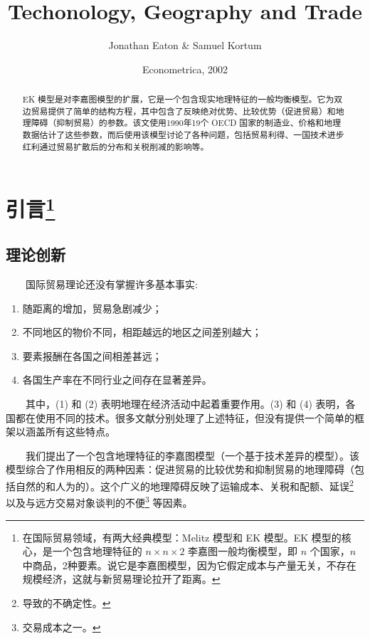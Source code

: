 \documentclass[]{article}
\title{Techonology, Geography and Trade}
\author{Jonathan Eaton \& Samuel Kortum}
\date{Econometrica, 2002}
\providecommand{\tightlist}{%
  \setlength{\itemsep}{0pt}\setlength{\parskip}{0pt}}
\let\rmarkdownfootnote\footnote%
\def\footnote{\protect\rmarkdownfootnote}
\begin{document}
\maketitle
\begin{abstract}
EK 模型是对李嘉图模型的扩展，它是一个包含现实地理特征的一般均衡模型。它为双边贸易提供了简单的结构方程，其中包含了反映绝对优势、比较优势（促进贸易）和地理障碍（抑制贸易）的参数。该文使用1990年19个 OECD 国家的制造业、价格和地理数据估计了这些参数，而后使用该模型讨论了各种问题，包括贸易利得、一国技术进步红利通过贸易扩散后的分布和关税削减的影响等。
\end{abstract}

{
\setcounter{tocdepth}{3}
\tableofcontents
}
\hypertarget{section}{%
\section[引言]{\texorpdfstring{引言\footnote{在国际贸易领域，有两大经典模型：Melitz 模型和 EK 模型。EK 模型的核心，是一个包含地理特征的 \(n \times n \times 2\) 李嘉图一般均衡模型，即 \(n\) 个国家，\(n\) 中商品，2种要素。说它是李嘉图模型，因为它假定成本与产量无关，不存在规模经济，这就与新贸易理论拉开了距离。}}{引言}}\label{section}}

\hypertarget{section-1}{%
\subsection{理论创新}\label{section-1}}

　　国际贸易理论还没有掌握许多基本事实:

\begin{enumerate}
\def\labelenumi{(\arabic{enumi})}
\tightlist
\item
  随距离的增加，贸易急剧减少；\\
\item
  不同地区的物价不同，相距越远的地区之间差别越大；\\
\item
  要素报酬在各国之间相差甚远；\\
\item
  各国生产率在不同行业之间存在显著差异。
\end{enumerate}

　　其中，(1) 和 (2) 表明地理在经济活动中起着重要作用。(3) 和 (4) 表明，各国都在使用不同的技术。很多文献分别处理了上述特征，但没有提供一个简单的框架以涵盖所有这些特点。

　　我们提出了一个包含地理特征的李嘉图模型（一个基于技术差异的模型）。该模型综合了作用相反的两种因素：促进贸易的比较优势和抑制贸易的地理障碍（包括自然的和人为的）。这个广义的地理障碍反映了运输成本、关税和配额、延误\footnote{导致的不确定性。} 以及与远方交易对象谈判的不便\footnote{交易成本之一。} 等因素。
\end{document}
